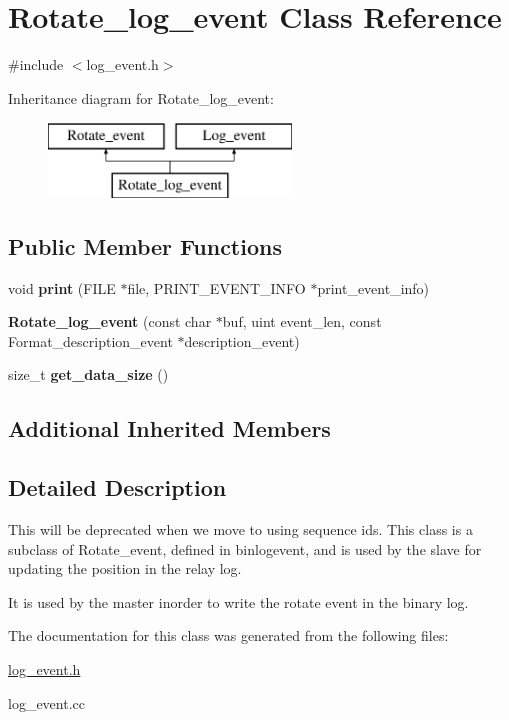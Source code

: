 \hypertarget{classRotate__log__event}{}\section{Rotate\+\_\+log\+\_\+event Class Reference}
\label{classRotate__log__event}


{\ttfamily \#include $<$log\+\_\+event.\+h$>$}

Inheritance diagram for Rotate\+\_\+log\+\_\+event\+:\begin{figure}[H]
\begin{center}
\leavevmode
\includegraphics[height=2.000000cm]{classRotate__log__event}
\end{center}
\end{figure}
\subsection*{Public Member Functions}
\begin{DoxyCompactItemize}
\item 
\mbox{\label{classRotate__log__event_a4d3200dd923088e8f3c7ba2fdbd18304}} 
void {\bfseries print} (F\+I\+LE $\ast$file, P\+R\+I\+N\+T\+\_\+\+E\+V\+E\+N\+T\+\_\+\+I\+N\+FO $\ast$print\+\_\+event\+\_\+info)
\item 
\mbox{\label{classRotate__log__event_ab4ebacb29efd048c53d85266e3def0f5}} 
{\bfseries Rotate\+\_\+log\+\_\+event} (const char $\ast$buf, uint event\+\_\+len, const Format\+\_\+description\+\_\+event $\ast$description\+\_\+event)
\item 
\mbox{\label{classRotate__log__event_a7bec90e8be3fcb29b3019daed9a40099}} 
size\+\_\+t {\bfseries get\+\_\+data\+\_\+size} ()
\end{DoxyCompactItemize}
\subsection*{Additional Inherited Members}


\subsection{Detailed Description}
This will be deprecated when we move to using sequence ids. This class is a subclass of Rotate\+\_\+event, defined in binlogevent, and is used by the slave for updating the position in the relay log.

It is used by the master inorder to write the rotate event in the binary log. 

The documentation for this class was generated from the following files\+:\begin{DoxyCompactItemize}
\item 
\mbox{\hyperlink{log__event_8h}{log\+\_\+event.\+h}}\item 
log\+\_\+event.\+cc\end{DoxyCompactItemize}
